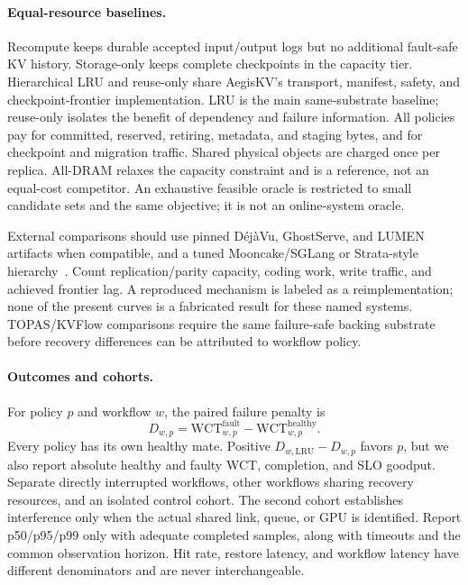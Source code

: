 \documentclass[sigplan,10pt,anonymous,nonacm]{acmart}
\begin{document}
\paragraph{Equal-resource baselines.}
Recompute keeps durable accepted input/output logs but no additional
fault-safe KV history. Storage-only keeps complete checkpoints in the
capacity tier. Hierarchical LRU and reuse-only share AegisKV's transport,
manifest, safety, and checkpoint-frontier implementation. LRU is the main
same-substrate baseline; reuse-only isolates the benefit of dependency and
failure information. All policies pay for committed, reserved, retiring,
metadata, and staging bytes, and for checkpoint and migration traffic.
Shared physical objects are charged once per replica. All-DRAM relaxes
the capacity constraint and is a reference, not an equal-cost competitor.
An exhaustive feasible oracle is restricted to small candidate sets and
the same objective; it is not an online-system oracle.

External comparisons should use pinned D\'ej\`aVu, GhostServe, and LUMEN
artifacts when compatible, and a tuned Mooncake/SGLang or Strata-style
hierarchy~\cite{strati2024dejavu,jayakody2026ghostserve,cao2026lumen,qin2025mooncake,xie2026strata}.
Count replication/parity capacity, coding work, write traffic, and achieved
frontier lag. A reproduced mechanism is labeled as a reimplementation;
none of the present curves is a fabricated result for these named systems.
TOPAS/KVFlow comparisons require the same failure-safe backing substrate
before recovery differences can be attributed to workflow policy.

\paragraph{Outcomes and cohorts.}
For policy $p$ and workflow $w$, the paired failure penalty is
\begin{equation}
 D_{w,p}=\mathrm{WCT}^{\mathrm{fault}}_{w,p}
          -\mathrm{WCT}^{\mathrm{healthy}}_{w,p}.
 \label{eq:eval-penalty}
\end{equation}
Every policy has its own healthy mate. Positive
$D_{w,\mathrm{LRU}}-D_{w,p}$ favors $p$, but we also report absolute healthy
and faulty WCT, completion, and SLO goodput. Separate directly interrupted
workflows, other workflows sharing recovery resources, and an isolated
control cohort. The second cohort establishes interference only when
the actual shared link, queue, or GPU is identified. Report p50/p95/p99
only with adequate completed samples, along with timeouts and the common
observation horizon. Hit rate, restore latency, and workflow latency have
different denominators and are never interchangeable.
\end{document}
